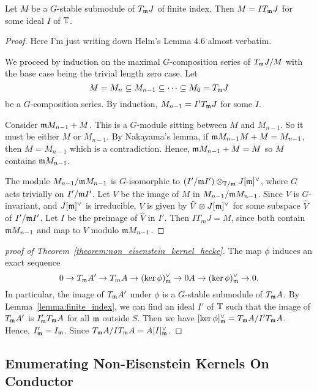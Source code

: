 \documentclass{article}
\begin{document}
\begin{lemma}\label{lemma:finite_index}
    Let $M$ be a $G$-stable submodule of $T_{\mathfrak{m}} J$ of finite index. Then
    $M=IT_{\mathfrak{m}} J$ for some ideal $I$ of $\mathbb{T}$.
\end{lemma}
\begin{proof}
    Here I'm just writing down Helm's Lemma 4.6 almost verbatim.

    We proceed by induction on the maximal $G$-composition series of $T_{\mathfrak{m}} J/M$
    with the base case being the trivial length zero case. Let 
    \[
        M = M_n \subseteq M_{n-1} \subseteq \cdots \subseteq M_0 = T_{\mathfrak{m}} J
    \]
    be a $G$-composition series. By induction, $M_{n-1} = I'T_{\mathfrak{m}} J$ for some
    $I$.

    Consider $\mathfrak{m} M_{n-1} + M$. This is a $G$-module sitting between $M$ and
    $M_{n-1}$. So it must be either $M$ or $M_{n-1}$. By Nakayama's lemma, if
    $\mathfrak{m} M_{n-1} M + M = M_{n-1}$, then $M=M_{n-1}$ which is a contradiction.
    Hence, $\mathfrak{m} M_{n-1}+M=M$ so $M$ contains $\mathfrak{m} M_{n-1}$.

    The module $M_{n-1}/\mathfrak{m} M_{n-1}$ is $G$-isomorphic to $(I'/\mathfrak{m} I')\otimes_{\mathbb{T}/\mathfrak{m}}
    J[\mathfrak{m}]^\vee$, where $G$ acts trivially on $I'/\mathfrak{m} I'$. Let $V$ be the image
    of $M$ in $M_{n-1}/\mathfrak{m} M_{n-1}$. Since $V$ is $G$-invariant, and
    $J[\mathfrak{m}]^\vee$ is irreducible, $V$ is given by $\hat{V}\otimes J[\mathfrak{m}]^\vee$
    for some subspace $\hat{V}$ of $I'/\mathfrak{m} I'$. Let $I$ be the preimage of
    $\hat{V}$ in $I'$. Then $IT_m J = M$, since both contain $\mathfrak{m} M_{n-1}$ and
    map to $V$ modulo $\mathfrak{m} M_{n-1}$.
\end{proof}

\begin{proof}[proof of Theorem~\ref{theorem:non_eisenstein_kernel_hecke}]
    The map $\phi$ induces an exact sequence
    \[
        0 \to T_{\mathfrak{m}} A' \to T_m A \to (\ker \phi)^\vee _{\mathfrak{m}} 
        \to 0 A \to (\ker \phi)^\vee _{\mathfrak{m}} \to 0.
    \]
    In particular, the image of $T_{\mathfrak{m}} A'$ under $\phi$ is a $G$-stable
    submodule of $T_{\mathfrak{m}} A$. By Lemma~\ref{lemma:finite_index}, we can find an
    ideal $I'$ of $\mathbb{T}$ such that the image of $T_{\mathfrak{m}} A'$ is $I' _{\mathfrak{m}} T_{\mathfrak{m}} A$ for
    all $\mathfrak{m}$ outside $S$. Then we have $[\ker \phi]^\vee _{\mathfrak{m}} = T_{\mathfrak{m}} A / I' T_{\mathfrak{m}}
    A$. Hence, $I' _{\mathfrak{m}} = I_{\mathfrak{m}}$. Since $T_{\mathfrak{m}} A/IT_{\mathfrak{m}} A= A[I]_{\mathfrak{m}} ^\vee$.
\end{proof}

\subsection{Enumerating Non-Eisenstein Kernels On Conductor}%
\label{sub:enumerating_non_eisenstein_kernels_on_conductor}
\end{document}
